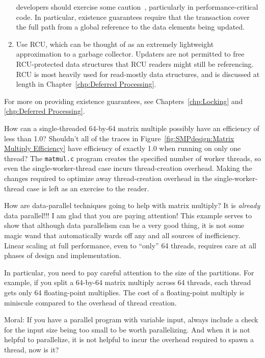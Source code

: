 \begin{enumerate}
		developers should exercise some
		caution~\cite{Blundell2005DebunkTM,Blundell2006TMdeadlock,McKenney2007PLOSTM},
		particularly in performance-critical code.
		In particular, existence guarantees require that the
		transaction cover the full path from a global reference
		to the data elements being updated.
	\item	Use RCU, which can be thought of as an extremely lightweight
		approximation to a garbage collector.
		Updaters are not permitted to free RCU-protected
		data structures that RCU readers might still be referencing.
		RCU is most heavily used for read-mostly data structures,
		and is discussed at length in
		Chapter~\ref{chp:Deferred Processing}.
	\end{enumerate}

	For more on providing existence guarantees, see
	Chapters~\ref{chp:Locking} and \ref{chp:Deferred Processing}.

\QuickQ{}
	How can a single-threaded 64-by-64 matrix multiple possibly
	have an efficiency of less than 1.0?
	Shouldn't all of the traces in
	Figure~\ref{fig:SMPdesign:Matrix Multiply Efficiency}
	have efficiency of exactly 1.0 when running on only one thread?
\QuickA{}
	The \texttt{matmul.c} program creates the specified number of
	worker threads, so even the single-worker-thread case incurs
	thread-creation overhead.
	Making the changes required to optimize away thread-creation
	overhead in the single-worker-thread case is left as an
	exercise to the reader.

\QuickQ{}
	How are data-parallel techniques going to help with matrix
	multiply?
	It is \emph{already} data parallel!!!
\QuickA{}
	I am glad that you are paying attention!
	This example serves to show that although data parallelism can
	be a very good thing, it is not some magic wand that automatically
	wards off any and all sources of inefficiency.
	Linear scaling at full performance, even to ``only'' 64 threads,
	requires care at all phases of design and implementation.

	In particular, you need to pay careful attention to the
	size of the partitions.
	For example, if you split a 64-by-64 matrix multiply across
	64 threads, each thread gets only 64 floating-point multiplies.
	The cost of a floating-point multiply is miniscule compared to
	the overhead of thread creation.

	Moral: If you have a parallel program with variable input,
	always include a check for the input size being too small to
	be worth parallelizing.
	And when it is not helpful to parallelize, it is not helpful
	to incur the overhead required to spawn a thread, now is it?

